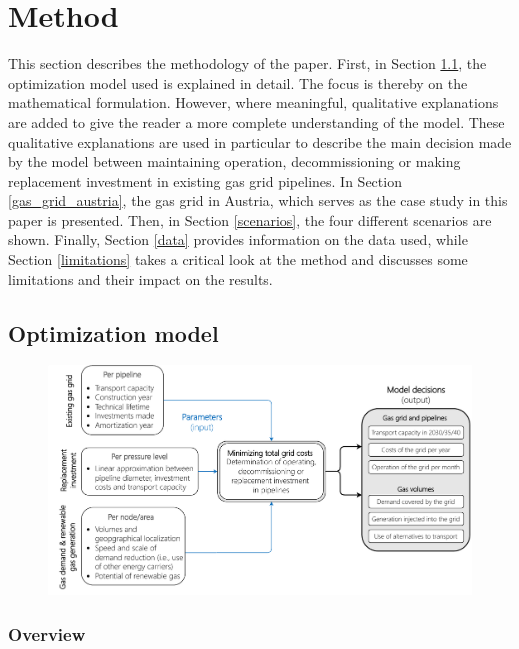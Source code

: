  \section{Method}\label{methodology}
This section describes the methodology of the paper. First, in Section \ref{model}, the optimization model used is explained in detail. The focus is thereby on the mathematical formulation. However, where meaningful, qualitative explanations are added to give the reader a more complete understanding of the model. These qualitative explanations are used in particular to describe the main decision made by the model between maintaining operation, decommissioning or making replacement investment in existing gas grid pipelines. In Section \ref{gas_grid_austria}, the gas grid in Austria, which serves as the case study in this paper is presented. Then, in Section \ref{scenarios}, the four different scenarios are shown. Finally, Section \ref{data} provides information on the data used, while Section \ref{limitations} takes a critical look at the method and discusses some limitations and their impact on the results.
 
 \subsection{Optimization model}\label{model}
 
 
 \begin{figure}[h]
 	\centering
 	\includegraphics[width=1\linewidth]{figures/method/overview.pdf}
 	\caption{}
 	\label{}
 \end{figure}
 
 \subsubsection{Overview}
 
 
